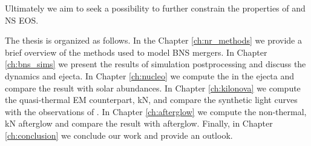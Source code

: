 Ultimately we aim to seek a possibility to further constrain the properties 
of \GW{} and \ac{NS} \ac{EOS}.




The thesis is organized as follows.
%
In the Chapter \ref{ch:nr_methods} we provide a brief overview 
of the methods used to model \ac{BNS} mergers.
%
In Chapter \ref{ch:bns_sims} we present the results of simulation 
postprocessing and discuss the \pmerg{} dynamics and ejecta.
%
In Chapter \ref{ch:nucleo} we compute the \rproc{} \nuc{} 
in the ejecta and compare the result with solar abundances.
%
In Chapter \ref{ch:kilonova} we compute the quasi-thermal 
\ac{EM} counterpart, \ac{kN}, and compare the synthetic 
light curves with the observations of \AT{}.
%
In Chapter \ref{ch:afterglow} we compute the non-thermal, 
\ac{kN} afterglow and compare the result with \GRB{} afterglow.
%
Finally, in Chapter \ref{ch:conclusion} 
we conclude our work and provide an outlook.